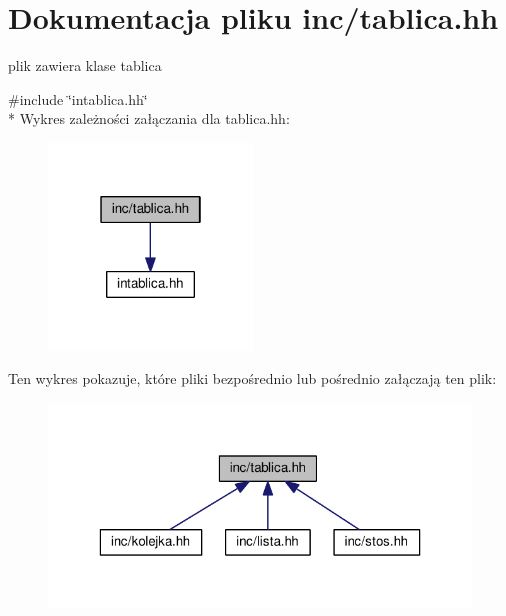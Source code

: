 \section{Dokumentacja pliku inc/tablica.hh}
\label{tablica_8hh}


plik zawiera klase tablica  


{\ttfamily \#include \char`\"{}intablica.\+hh\char`\"{}}\\*
Wykres zależności załączania dla tablica.\+hh\+:
\nopagebreak
\begin{figure}[H]
\begin{center}
\leavevmode
\includegraphics[width=154pt]{tablica_8hh__incl}
\end{center}
\end{figure}
Ten wykres pokazuje, które pliki bezpośrednio lub pośrednio załączają ten plik\+:
\nopagebreak
\begin{figure}[H]
\begin{center}
\leavevmode
\includegraphics[width=323pt]{tablica_8hh__dep__incl}
\end{center}
\end{figure}
